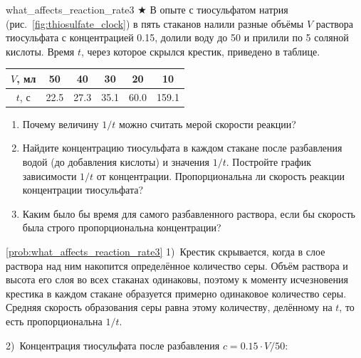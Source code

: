 \begin{problem}{}{what_affects_reaction_rate3}
    $\bigstar$ В опыте с тиосульфатом натрия (рис.~\ref{fig:thiosulfate_clock}) в пять стаканов налили разные объёмы $V$ раствора тиосульфата с концентрацией \qty{0,15}{\ruMolar}, долили воду до \qty{50}{\ruMl} и прилили по \qty{5}{\ruMl} соляной кислоты. Время $t$, через которое скрылся крестик, приведено в таблице.
    \begin{center}
        \small
        \begin{tabular}{cccccc}
            \hline
            \rowcolor{table_header}
            $V$, мл & 50 & 40 & 30 & 20 & 10 \\
            \hline
            $t$, с & \num{22,5} & \num{27,3} & \num{35,1} & \num{60,0} & \num{159,1} \\
            \hline
        \end{tabular}
    \end{center}
    \begin{enumerate}[label=\arabic*)]
        \item Почему величину $1/t$ можно считать мерой скорости реакции?
        \item Найдите концентрацию тиосульфата в каждом стакане после разбавления водой (до добавления кислоты) и значения $1/t$. Постройте график зависимости $1/t$ от концентрации. Пропорциональна ли скорость реакции концентрации тиосульфата?
        \item Каким было бы время для самого разбавленного раствора, если бы скорость была строго пропорциональна концентрации?
    \end{enumerate}
    \begin{sol}{\ref{prob:what_affects_reaction_rate3}}
        1)~Крестик скрывается, когда в слое раствора над ним накопится определённое количество серы. Объём раствора и высота его слоя во всех стаканах одинаковы, поэтому к моменту исчезновения крестика в каждом стакане образуется примерно одинаковое количество серы. Средняя скорость образования серы равна этому количеству, делённому на $t$, то есть пропорциональна $1/t$.

        2)~Концентрация тиосульфата после разбавления $c = \num{0,15} \cdot V/50$:


\end{sol}
\end{problem}
